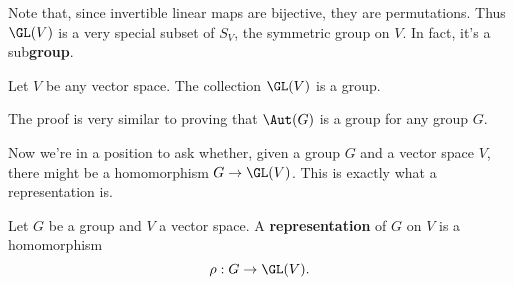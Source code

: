Note that, since invertible linear maps are bijective, they are permutations.
Thus $\GL(V)$ is a very special subset of $S_V$, the symmetric group on $V$.
In fact, it's a sub{\bf group}.

\begin{proposition}
    Let $V$ be any vector space.
    The collection $\GL(V)$ is a group.
\end{proposition}

The proof is very similar to proving that $\Aut(G)$ is a group for any group $G$.

Now we're in a position to ask whether, given a group $G$ and a vector space $V$, there might
be a homomorphism $G\to \GL(V)$. This is exactly what a representation is.

\begin{definition}[Representation]
    Let $G$ be a group and $V$ a vector space.
    A {\bf representation} of $G$ on $V$ is a homomorphism 
    \[
        \rho:G\to\GL(V).
    \]
\end{definition}


